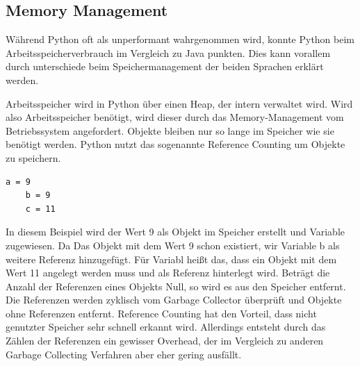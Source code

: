 \subsection{Memory Management}
Während Python oft als unperformant wahrgenommen wird, konnte Python beim Arbeitsspeicherverbrauch im Vergleich 
zu Java punkten. Dies kann vorallem durch unterschiede beim Speichermanagement der beiden Sprachen erklärt werden. 

Arbeitsspeicher wird in Python über einen Heap, der intern verwaltet wird. Wird also Arbeitsspeicher benötigt, 
wird dieser durch das Memory-Management vom Betriebssystem angefordert. Objekte bleiben nur so lange im Speicher 
wie sie benötigt werden. Python nutzt das sogenannte Reference Counting um Objekte zu speichern.

\begin{lstlisting}[caption={Codebeispiel zur Verwaltung von Objekten in Python}]
    a = 9
    b = 9
    c = 11
\end{lstlisting}

In diesem Beispiel wird der Wert 9 als Objekt im Speicher erstellt und Variable  zugewiesen. Da 
Das Objekt mit dem Wert 9 schon existiert, wir Variable {b} als weitere Referenz hinzugefügt. Für Variabl 
 heißt das, dass ein Objekt mit dem Wert 11 angelegt werden muss und  als Referenz hinterlegt wird. 
Beträgt die Anzahl der Referenzen eines Objekts Null, so wird es aus den Speicher entfernt. Die Referenzen 
werden zyklisch vom Garbage Collector überprüft und Objekte ohne Referenzen entfernt. Reference Counting 
hat den Vorteil, dass nicht genutzter Speicher sehr schnell erkannt wird. Allerdings entsteht durch das Zählen 
der Referenzen ein gewisser Overhead, der im Vergleich zu anderen Garbage Collecting Verfahren aber eher gering ausfällt.

